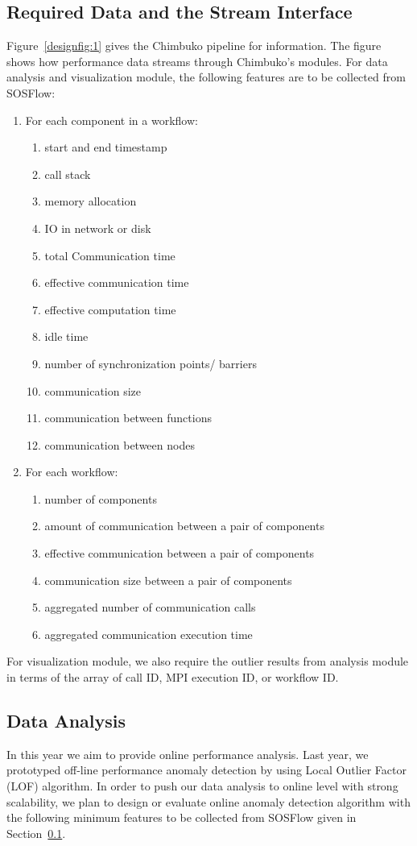\subsection{Required Data and the Stream Interface}
\label{subsection:features}
Figure~\ref{designfig:1} gives the Chimbuko pipeline for information. The figure shows how performance data streams through Chimbuko's modules. For data analysis and visualization module, the following features are to be collected from SOSFlow:
\begin{enumerate}
\item {For each component in a workflow:}
\begin{enumerate}
\item start and end timestamp
\item call stack
\item memory allocation
\item IO in network or disk
\item total Communication time
\item effective  communication time
\item effective computation time
\item idle time
\item number of synchronization points/ barriers
\item communication size
\item communication between functions
\item communication between nodes
\end{enumerate}
\item  For each workflow:
\begin{enumerate}
\item number of components
\item amount of communication between a pair of components
\item effective communication between a pair of components
\item communication size between a pair of components
\item aggregated number of communication calls 
\item aggregated communication execution time
\end{enumerate}
\end{enumerate}

For visualization module, we also require the outlier results from analysis module in terms of the array of call ID, MPI execution ID, or workflow ID. 


\subsection{Data Analysis}
In this year we aim to provide online performance analysis. Last year, we prototyped off-line performance anomaly detection by using Local Outlier Factor (LOF) algorithm. In order to push our data analysis to online level with strong scalability, we plan to design or evaluate online anomaly detection algorithm  with the following minimum features to be collected from SOSFlow given in Section~\ref{subsection:features}.
